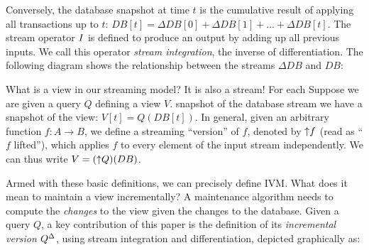 Conversely, the database snapshot at time $t$ is the cumulative result
of applying all transactions up to $t$: $DB[t] = \Delta DB[0] + \Delta
DB[1] + \ldots + \Delta DB[t]$.  The stream operator $\mathit{I}$ is defined
to produce an output by adding up all previous inputs.  We call this
operator \emph{stream integration}, the inverse of differentiation.
The following diagram shows the relationship between the streams
$\Delta DB$ and $DB$:
\begin{center}
\end{center}

What is a view in our streaming model?  It is also a stream!  For each
Suppose we are given a query $Q$ defining a view $V$.  snapshot of the
database stream we have a snapshot of the view: $V[t] = Q(DB[t])$.  In
general, given an arbitrary function $f: A \to B$, we define a
streaming ``version'' of $f$, denoted by ${\uparrow}f$ (read as ``$f$
lifted''), which applies $f$ to every element of the input stream
independently.  We can thus write $V = ({\uparrow}Q)(DB)$.

Armed with these basic definitions, we can precisely define IVM.  What
does it mean to maintain a view incrementally?  A maintenance
algorithm needs to compute the \emph{changes} to the view given the
changes to the database. Given a query $Q$, a key contribution of this
paper is the definition of its \emph{incremental version} ${Q}^{\Delta}$,
using stream integration and differentiation, depicted graphically as:

\begin{center}
\end{center}

